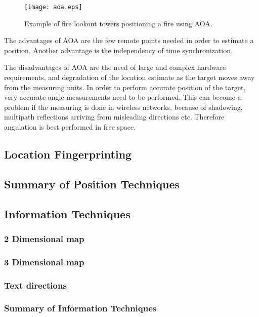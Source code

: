   \begin{figure}
    \centering
    \texttt{[image: aoa.eps]}
    \caption{Example of fire lookout towers positioning a fire using AOA.}
      \label{fig:aoa}
  \end{figure}

  The advantages of AOA are the few remote points needed in order to estimate a position. Another advantage is the independency of time synchronization.

  The disadvantages of AOA are the need of large and complex hardware requirements, and degradation of the location estimate as the target moves away from the measuring units. In order to perform accurate position of the target, very accurate angle measurements need to be performed. This can become a problem if the measuring is done in wireless networks, because of shadowing, multipath reflections arriving from misleading directions etc. Therefore angulation is best performed in free space.

  \subsection{Location Fingerprinting}

  \subsection{Summary of Position Techniques}

  \subsection{Information Techniques}

  \subsubsection{2 Dimensional map}

  \subsubsection{3 Dimensional map}

  \subsubsection{Text directions}

  \subsubsection{Summary of Information Techniques}

